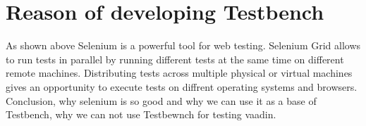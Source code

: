  \section{Reason of developing Testbench}
  	As shown above Selenium is a powerful tool for web testing. 
	Selenium Grid allows to run tests in parallel by running different tests at the
	same time on different remote machines. Distributing tests across 
	multiple physical or virtual machines gives an opportunity to execute tests 
	on diffrent operating systems and browsers. 	Conclusion, why selenium is so good and why we can use it as a base of
	Testbench, why we can not use Testbewnch for testing vaadin. 